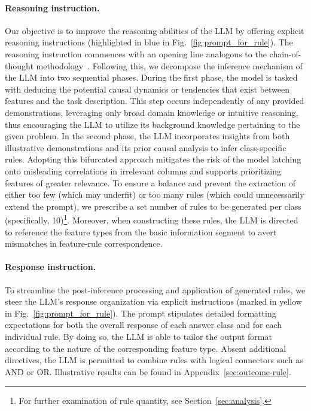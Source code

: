 \paragraph{Reasoning instruction.} Our objective is to improve the reasoning abilities of the LLM by offering explicit reasoning instructions (highlighted in blue in Fig.~\ref{fig:prompt_for_rule}). The reasoning instruction commences with an opening line analogous to the chain-of-thought methodology~\cite{wei2022chain}. Following this, we decompose the inference mechanism of the LLM into two sequential phases. During the first phase, the model is tasked with deducing the potential causal dynamics or tendencies that exist between features and the task description. This step occurs independently of any provided demonstrations, leveraging only broad domain knowledge or intuitive reasoning, thus encouraging the LLM to utilize its background knowledge pertaining to the given problem. In the second phase, the LLM incorporates insights from both illustrative demonstrations and its prior causal analysis to infer class-specific rules. Adopting this bifurcated approach mitigates the risk of the model latching onto misleading correlations in irrelevant columns and supports prioritizing features of greater relevance. To ensure a balance and prevent the extraction of either too few (which may underfit) or too many rules (which could unnecessarily extend the prompt), we prescribe a set number of rules to be generated per class (specifically, 10)\footnote{For further examination of rule quantity, see Section~\ref{sec:analysis}.}. Moreover, when constructing these rules, the LLM is directed to reference the feature types from the basic information segment to avert mismatches in feature-rule correspondence.

\vspace*{-0.12in}
\paragraph{Response instruction.} To streamline the post-inference processing and application of generated rules, we steer the LLM’s response organization via explicit instructions (marked in yellow in Fig.~\ref{fig:prompt_for_rule}). The prompt stipulates detailed formatting expectations for both the overall response of each answer class and for each individual rule. By doing so, the LLM is able to tailor the output format according to the nature of the corresponding feature type. Absent additional directives, the LLM is permitted to combine rules with logical connectors such as AND or OR. Illustrative results can be found in Appendix~\ref{sec:outcome-rule}.

